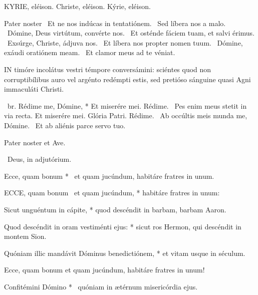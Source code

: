\label{feria5:precesferialesnona}

KYRIE, eléison. Christe, eléison. Kýrie, eléison.

Pater noster  \V\ Et ne nos indúcas in tentatiónem. \R\ Sed líbera nos a malo. \V\ Dómine, Deus virtútum, convérte nos. \R\ Et osténde fáciem tuam, et salvi érimus. \V\ Exsúrge, Christe, ádjuva nos. \R\ Et líbera nos propter nomen tuum. \V\ Dómine, exáudi oratiónem meam. \R\ Et clamor meus ad te véniat.




\lettrine[lines=2]{I}{N} timóre incolátus vestri témpore conversámini: sciéntes quod non corruptibílibus auro vel argénto redémpti estis, sed pretióso sánguine quasi Agni immaculáti Christi.

\R\ br. Rédime me, Dómine, * Et miserére mei. Rédime. \V\ Pes enim meus stetit in via recta. Et miserére mei. Glória Patri. Rédime. \V\ Ab occúltis meis munda me, Dómine. \R\ Et ab aliénis parce servo tuo.



\sectionornament


Pater noster et Ave.

\V\ Deus, in adjutórium.

 Ecce, quam bonum * \textdagger\ et quam jucúndum, habitáre fratres in unum. \textdaggerdbl


\lettrine[lines=2]{E}{CCE}, quam bonum \textdagger\ et quam jucúndum, * habitáre fratres in unum: \textdaggerdbl

Sicut unguéntum in cápite, * quod descéndit in barbam, barbam Aaron.

Quod descéndit in oram vestiménti ejus: * sicut ros Hermon, qui descéndit in montem Sion.

Quóniam illic mandávit Dóminus benedictiónem, * et vitam usque in séculum.

 Ecce, quam bonum et quam jucúndum, habitáre fratres in unum!

 Confitémini Dómino * \textdagger\ quóniam in ætérnum misericórdia ejus.

